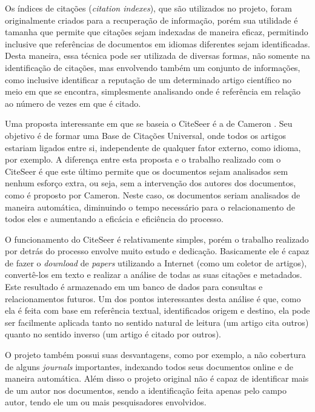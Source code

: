 Os índices de citações (\textit{citation indexes}), que são utilizados no projeto, foram originalmente criados para a recuperação de informação, porém sua utilidade é tamanha que permite que citações sejam indexadas de maneira eficaz, permitindo inclusive que referências de documentos em idiomas diferentes sejam identificadas. Desta maneira, essa técnica pode ser utilizada de diversas formas, não somente na identificação de citações, mas envolvendo também um conjunto de informações, como inclusive identificar a reputação de um determinado artigo científico no meio em que se encontra, simplesmente analisando onde é referência em relação ao número de vezes em que é citado.

Uma proposta interessante em que se baseia o CiteSeer é a de Cameron \cite{cameron}. Seu objetivo é de formar uma Base de Citações Universal, onde todos os artigos estariam ligados entre si, independente de qualquer fator externo, como idioma, por exemplo. A diferença entre esta proposta e o trabalho realizado com o CiteSeer é que este último permite que os documentos sejam analisados sem nenhum esforço extra, ou seja, sem a intervenção dos autores dos documentos, como é proposto por Cameron. Neste caso, os documentos seriam analisados de maneira automática, diminuindo o tempo necessário para o relacionamento de todos eles e aumentando a eficácia e eficiência do processo.

O funcionamento do CiteSeer é relativamente simples, porém o trabalho realizado por detrás do processo envolve muito estudo e dedicação. Basicamente ele é capaz de fazer o \textit{download} de \textit{papers} utilizando a Internet (como um coletor de artigos), convertê-los em texto e realizar a análise de todas as suas citações e metadados. Este resultado é armazenado em um banco de dados para consultas e relacionamentos futuros. Um dos pontos interessantes desta análise é que, como ela é feita com base em referência textual, identificados origem e destino, ela pode ser facilmente aplicada tanto no sentido natural de leitura (um artigo cita outros) quanto no sentido inverso (um artigo é citado por outros). 

O projeto também possui suas desvantagens, como por exemplo, a não cobertura de alguns \textit{journals} importantes, indexando todos seus documentos online e de maneira automática. Além disso o projeto original não é capaz de identificar mais de um autor nos documentos, sendo a identificação feita apenas pelo campo autor, tendo ele um ou mais pesquisadores envolvidos.

